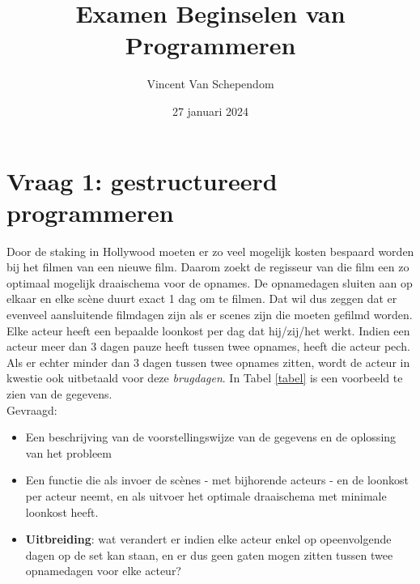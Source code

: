 \documentclass[kulak]{kulakarticle} %
\title{Examen Beginselen van Programmeren}
\author{Vincent Van Schependom}
\date{27 januari 2024}
\begin{document}
	\maketitle

	\section*{Vraag 1: gestructureerd programmeren}

	Door de staking in Hollywood moeten er zo veel mogelijk kosten bespaard worden bij het filmen van een nieuwe film. Daarom zoekt de regisseur van die film een zo optimaal mogelijk draaischema voor de opnames. De opnamedagen sluiten aan op elkaar en elke scène duurt exact 1 dag om te filmen. Dat wil dus zeggen dat er evenveel aansluitende filmdagen zijn als er scenes zijn die moeten gefilmd worden.\\

	Elke acteur heeft een bepaalde loonkost per dag dat hij/zij/het werkt. Indien een acteur meer dan 3 dagen pauze heeft tussen twee opnames, heeft die acteur pech. Als er echter minder dan 3 dagen tussen twee opnames zitten, wordt de acteur in kwestie ook uitbetaald voor deze \textit{brugdagen}. In Tabel \ref{tabel} is een voorbeeld te zien van de gegevens.\\

	Gevraagd:
	\begin{itemize}
		\item Een beschrijving van de voorstellingswijze van de gegevens en de oplossing van het probleem
		\item Een functie die als invoer de scènes - met bijhorende acteurs - en de loonkost per acteur neemt, en als uitvoer het optimale draaischema met minimale loonkost heeft.
		\item \textbf{Uitbreiding}: wat verandert er indien elke acteur enkel op opeenvolgende dagen op de set kan staan, en er dus geen gaten mogen zitten tussen twee opnamedagen voor elke acteur?
	\end{itemize}
\end{document}
